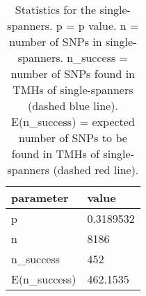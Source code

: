 \begin{table}

\caption{\label{tab:snp_stats_per_spanner_single}Statistics for the single-spanners. p = p value. n = number of SNPs in single-spanners. n\_success = number of SNPs found in TMHs of single-spanners (dashed blue line). E(n\_success) = expected number of SNPs to be found in TMHs of single-spanners  (dashed red line). }
\centering
\begin{tabular}[t]{l|l}
\hline
parameter & value\\
\hline
p & 0.3189532\\
\hline
n & 8186\\
\hline
n\_success & 452\\
\hline
E(n\_success) & 462.1535\\
\hline
\end{tabular}
\end{table}